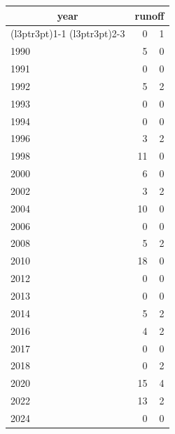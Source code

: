 \footnotesize\begin{tabular}[t]{lrr}
\toprule
\multicolumn{1}{c}{year} & \multicolumn{2}{c}{runoff} \\
\cmidrule(l{3pt}r{3pt}){1-1} \cmidrule(l{3pt}r{3pt}){2-3}
  & 0 & 1\\
\midrule
1990 & 5 & 0\\
1991 & 0 & 0\\
1992 & 5 & 2\\
1993 & 0 & 0\\
1994 & 0 & 0\\
1996 & 3 & 2\\
1998 & 11 & 0\\
2000 & 6 & 0\\
2002 & 3 & 2\\
2004 & 10 & 0\\
2006 & 0 & 0\\
2008 & 5 & 2\\
2010 & 18 & 0\\
2012 & 0 & 0\\
2013 & 0 & 0\\
2014 & 5 & 2\\
2016 & 4 & 2\\
2017 & 0 & 0\\
2018 & 0 & 2\\
2020 & 15 & 4\\
2022 & 13 & 2\\
2024 & 0 & 0\\
\bottomrule
\end{tabular}
